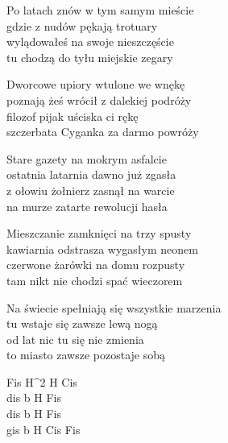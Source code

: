 \begin{textn}
    Po latach znów w tym samym mieście\\
    gdzie z nudów pękają trotuary\\
    wylądowałeś na swoje nieszczęście\\
    tu chodzą do tyłu miejskie zegary

    Dworcowe upiory wtulone we wnękę\\
    poznają żeś wrócił z dalekiej podróży\\
    filozof pijak uściska ci rękę\\
    szczerbata Cyganka za darmo powróży

    Stare gazety na mokrym asfalcie\\
    ostatnia latarnia dawno już zgasła\\
    z ołowiu żołnierz zasnął na warcie\\
    na murze zatarte rewolucji hasła

    Mieszczanie zamknięci na trzy spusty\\
    kawiarnia odstrasza wygasłym neonem\\
    czerwone żarówki na domu rozpusty\\
    tam nikt nie chodzi spać wieczorem

    Na świecie spełniają się wszystkie marzenia\\
    tu wstaje się zawsze lewą nogą\\
    od lat nic tu się nie zmienia\\
    to miasto zawsze pozostaje sobą
\end{textn}
\begin{chordw}
    Fis H^{2} H Cis\\
    dis b H Fis\\
    dis b H Fis\\
    gis b H Cis Fis
\end{chordw}